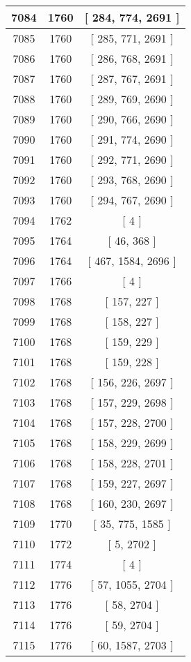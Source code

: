 \begin{center}
\begin{longtable}[H]{|| c c c ||}
\hline
7084 & 1760 & [ 284, 774, 2691 ] \\ 
\hline
7085 & 1760 & [ 285, 771, 2691 ] \\ 
\hline
7086 & 1760 & [ 286, 768, 2691 ] \\ 
\hline
7087 & 1760 & [ 287, 767, 2691 ] \\ 
\hline
7088 & 1760 & [ 289, 769, 2690 ] \\ 
\hline
7089 & 1760 & [ 290, 766, 2690 ] \\ 
\hline
7090 & 1760 & [ 291, 774, 2690 ] \\ 
\hline
7091 & 1760 & [ 292, 771, 2690 ] \\ 
\hline
7092 & 1760 & [ 293, 768, 2690 ] \\ 
\hline
7093 & 1760 & [ 294, 767, 2690 ] \\ 
\hline
7094 & 1762 & [ 4 ] \\ 
\hline
7095 & 1764 & [ 46, 368 ] \\ 
\hline
7096 & 1764 & [ 467, 1584, 2696 ] \\ 
\hline
7097 & 1766 & [ 4 ] \\ 
\hline
7098 & 1768 & [ 157, 227 ] \\ 
\hline
7099 & 1768 & [ 158, 227 ] \\ 
\hline
7100 & 1768 & [ 159, 229 ] \\ 
\hline
7101 & 1768 & [ 159, 228 ] \\ 
\hline
7102 & 1768 & [ 156, 226, 2697 ] \\ 
\hline
7103 & 1768 & [ 157, 229, 2698 ] \\ 
\hline
7104 & 1768 & [ 157, 228, 2700 ] \\ 
\hline
7105 & 1768 & [ 158, 229, 2699 ] \\ 
\hline
7106 & 1768 & [ 158, 228, 2701 ] \\ 
\hline
7107 & 1768 & [ 159, 227, 2697 ] \\ 
\hline
7108 & 1768 & [ 160, 230, 2697 ] \\ 
\hline
7109 & 1770 & [ 35, 775, 1585 ] \\ 
\hline
7110 & 1772 & [ 5, 2702 ] \\ 
\hline
7111 & 1774 & [ 4 ] \\ 
\hline
7112 & 1776 & [ 57, 1055, 2704 ] \\ 
\hline
7113 & 1776 & [ 58, 2704 ] \\ 
\hline
7114 & 1776 & [ 59, 2704 ] \\ 
\hline
7115 & 1776 & [ 60, 1587, 2703 ] \\ 
\hline

\end{longtable}
\end{center}
